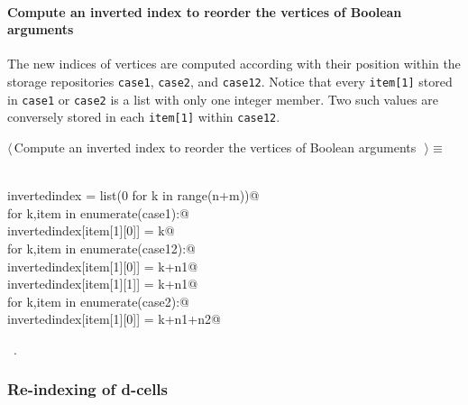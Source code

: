 \documentclass[11pt,oneside]{article}	%
\begin{document}
\paragraph{Compute an inverted index to reorder the vertices of Boolean arguments}
The new indices of vertices are computed according with their position within the storage repositories \texttt{case1}, \texttt{case2}, and \texttt{case12}. Notice that every \texttt{item[1]} stored in \texttt{case1} or \texttt{case2} is a list with only one integer member. Two such values are conversely stored in each \texttt{item[1]} within \texttt{case12}.
\begin{flushleft} \small \label{scrap6}
$\langle\,$Compute an inverted index to reorder the vertices of Boolean arguments\nobreak\ {\footnotesize {}}$\,\rangle\equiv$
\vspace{-1ex}
\begin{list}{}{} \item
\mbox{}\verb@@\\
\mbox{}\verb@   invertedindex = list(0 for k in range(n+m))@\\
\mbox{}\verb@   for k,item in enumerate(case1):@\\
\mbox{}\verb@      invertedindex[item[1][0]] = k@\\
\mbox{}\verb@   for k,item in enumerate(case12):@\\
\mbox{}\verb@      invertedindex[item[1][0]] = k+n1@\\
\mbox{}\verb@      invertedindex[item[1][1]] = k+n1@\\
\mbox{}\verb@   for k,item in enumerate(case2):@\\
\mbox{}\verb@      invertedindex[item[1][0]] = k+n1+n2@\\
\mbox{}\verb@@{\NWsep}
\end{list}
\vspace{-1ex}
\footnotesize\addtolength{\baselineskip}{-1ex}
\begin{list}{}{\setlength{\itemsep}{-\parsep}\setlength{\itemindent}{-\leftmargin}}
\item \NWtxtMacroRefIn\ .
\end{list}
\end{flushleft}

\subsubsection{Re-indexing of d-cells}
\end{document}
